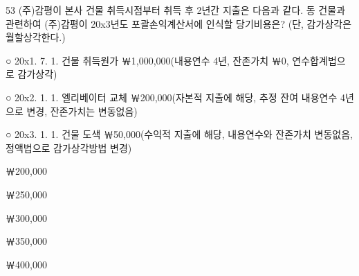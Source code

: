 \begin{question}{53}
(주)감평이 본사 건물 취득시점부터 취득 후 2년간 지출은 다음과 같다. 동 건물과 관련하여 (주)감평이 20x3년도 포괄손익계산서에 인식할 당기비용은? (단, 감가상각은 월할상각한다.)
\begin{framedtext}
○ 20x1. 7. 1. 건물 취득원가 ￦1,000,000(내용연수 4년, 잔존가치 ￦0, 연수합계법으로 감가상각) \par
○ 20x2. 1. 1. 엘리베이터 교체 ￦200,000(자본적 지출에 해당, 추정 잔여 내용연수 4년으로 변경, 잔존가치는 변동없음) \par
○ 20x3. 1. 1. 건물 도색 ￦50,000(수익적 지출에 해당, 내용연수와 잔존가치 변동없음, 정액법으로 감가상각방법 변경)
\end{framedtext}
\begin{choices}
  \item ￦200,000
  \item ￦250,000
  \item ￦300,000
  \item ￦350,000
  \item ￦400,000
\end{choices}
\end{question}
